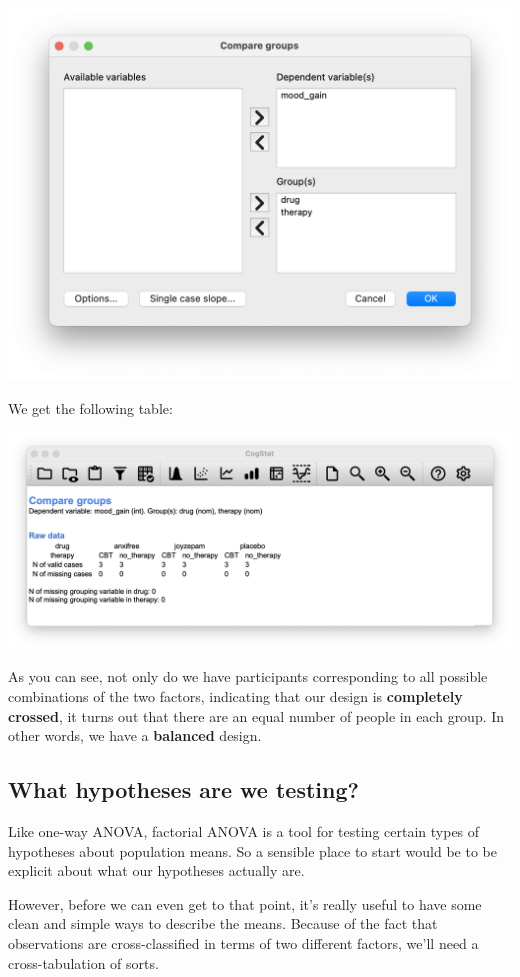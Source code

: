 \documentclass[
  11pt,
  a4paper,
  twoside,symmetric,openright]{book}
\theoremstyle{break}
\theoremstyle{break}
\begin{document}
\begin{center}\includegraphics[width=0.6\linewidth]{resources/image/cogstatcompareclinanova2} \end{center}

We get the following table:

\begin{center}\includegraphics[width=0.6\linewidth]{resources/image/cogstatanova2clinload} \end{center}

As you can see, not only do we have participants corresponding to all possible combinations of the two factors, indicating that our design is \textbf{completely crossed}, it turns out that there are an equal number of people in each group. In other words, we have a \textbf{balanced} design.

\subsection{What hypotheses are we testing?}\label{factanovahyp}

Like one-way ANOVA, factorial ANOVA is a tool for testing certain types of hypotheses about population means. So a sensible place to start would be to be explicit about what our hypotheses actually are.

However, before we can even get to that point, it's really useful to have some clean and simple ways to describe the means. Because of the fact that observations are cross-classified in terms of two different factors, we'll need a cross-tabulation of sorts.
\end{document}

